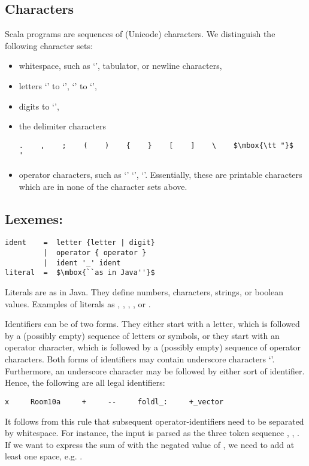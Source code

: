\subsection*{Characters}

Scala programs are sequences of (Unicode) characters. We distinguish the
following character sets:
\begin{itemize}
\item
whitespace, such as `\code{ }', tabulator, or newline characters,
\item
letters `' to `', `' to `',
\item
digits  to `',
\item
the delimiter characters

\begin{lstlisting}
.    ,    ;    (    )    {    }    [    ]    \    $\mbox{\tt "}$    '
\end{lstlisting}

\item
operator characters, such as `\code{#}' `\code{+}',
`\code{:}'. Essentially, these are printable characters which are
in none of the character sets above.
\end{itemize}

\subsection*{Lexemes:}

\begin{lstlisting}
ident    =  letter {letter | digit}
         |  operator { operator }
         |  ident '_' ident
literal  =  $\mbox{``as in Java''}$
\end{lstlisting}

Literals are as in Java. They define numbers, characters, strings, or
boolean values.  Examples of literals as , , ,
, or .

Identifiers can be of two forms. They either start with a letter,
which is followed by a (possibly empty) sequence of letters or
symbols, or they start with an operator character, which is followed
by a (possibly empty) sequence of operator characters.  Both forms of
identifiers may contain underscore characters `\code{_}'. Furthermore,
an underscore character may be followed by either sort of
identifier. Hence, the following are all legal identifiers:
\begin{lstlisting}
x     Room10a     +     --     foldl_:     +_vector
\end{lstlisting}
It follows from this rule that subsequent operator-identifiers need to
be separated by whitespace. For instance, the input
 is parsed as the three token sequence , \code{+-},
. If we want to express the sum of  with the
negated value of , we need to add at least one space,
e.g. .

